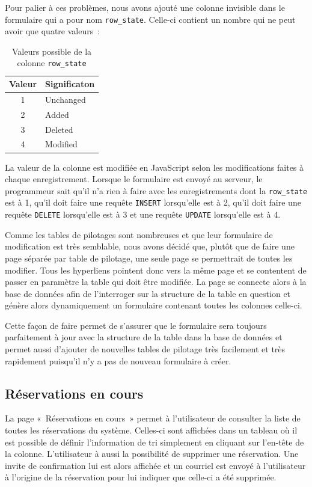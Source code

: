 \documentclass[letter, 11pt]{report}
\begin{document}
Pour palier à ces problèmes, nous avons ajouté une colonne invisible dans le formulaire qui a pour nom \texttt{row\_state}. Celle-ci contient un nombre qui ne peut avoir que quatre valeurs~:

\begin{table}[htbp]
	\caption{Valeurs possible de la colonne \texttt{row\_state}}
	\begin{center}
		\begin{tabular}{|c|l|}
			\hline
			Valeur & Significaton \\
			\hline
			1      & Unchanged \\
			2      & Added \\
			3      & Deleted \\
			4      & Modified \\
			\hline
		\end{tabular}
	\end{center}
\end{table}

La valeur de la colonne est modifiée en JavaScript selon les modifications faites à chaque enregistrement. Lorsque le formulaire est envoyé au serveur, le programmeur sait qu'il n'a rien à faire avec les enregistrements dont la \texttt{row\_state} est à 1, qu'il doit faire une requête \texttt{INSERT} lorsqu'elle est à 2, qu'il doit faire une requête \texttt{DELETE} lorsqu'elle est à 3 et une requête \texttt{UPDATE} lorsqu'elle est à 4.

Comme les tables de pilotages sont nombreuses et que leur formulaire de modification est très semblable, nous avons décidé que, plutôt que de faire une page séparée par table de pilotage, une seule page se permettrait de toutes les modifier. Tous les hyperliens pointent donc vers la même page et se contentent de passer en paramètre la table qui doit être modifiée. La page se connecte alors à la base de données afin de l'interroger sur la structure de la table en question et génère alors dynamiquement un formulaire contenant toutes les colonnes celle-ci.

Cette façon de faire permet de s'assurer que le formulaire sera toujours parfaitement à jour avec la structure de la table dans la base de données et permet aussi d'ajouter de nouvelles tables de pilotage très facilement et très rapidement puisqu'il n'y a pas de nouveau formulaire à créer.

\subsection{Réservations en cours}
La page «~Réservations en cours~» permet à l'utilisateur de consulter la liste de toutes les réservations du système. Celles-ci sont affichées dans un tableau où il est possible de définir l'information de tri simplement en cliquant sur l'en-tête de la colonne. L'utilisateur à aussi la possibilité de supprimer une réservation. Une invite de confirmation lui est alors affichée et un courriel est envoyé à l'utilisateur à l'origine de la réservation pour lui indiquer que celle-ci a été supprimée.
\end{document}
